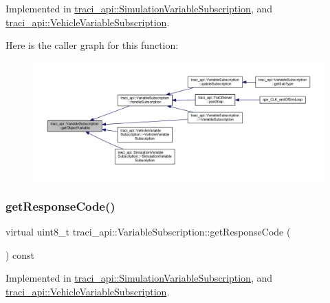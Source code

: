 Implemented in \hyperlink{classtraci__api_1_1_simulation_variable_subscription_aaa64f6368289ff45730d718e3f38f762}{traci\+\_\+api\+::\+Simulation\+Variable\+Subscription}, and \hyperlink{classtraci__api_1_1_vehicle_variable_subscription_afaefff100368a747aefb8be29e8a7a91}{traci\+\_\+api\+::\+Vehicle\+Variable\+Subscription}.

Here is the caller graph for this function\+:\nopagebreak
\begin{figure}[H]
\begin{center}
\leavevmode
\includegraphics[width=350pt]{classtraci__api_1_1_variable_subscription_a884dba03a44455e86c417c3641ec6aa4_icgraph}
\end{center}
\end{figure}
\mbox{\label{classtraci__api_1_1_variable_subscription_a3e852072c435d02f96ff91f81506cef9}} 
\subsubsection{\texorpdfstring{get\+Response\+Code()}{getResponseCode()}}
{\footnotesize\ttfamily virtual uint8\+\_\+t traci\+\_\+api\+::\+Variable\+Subscription\+::get\+Response\+Code (\begin{DoxyParamCaption}{ }\end{DoxyParamCaption}) const\hspace{0.3cm}{\ttfamily [pure virtual]}}



Implemented in \hyperlink{classtraci__api_1_1_simulation_variable_subscription_a1f5a6a5d62fe7a054f87311b0c5b6f5f}{traci\+\_\+api\+::\+Simulation\+Variable\+Subscription}, and \hyperlink{classtraci__api_1_1_vehicle_variable_subscription_a77ac472ae8dc1f284c2ec3f64b88cd0d}{traci\+\_\+api\+::\+Vehicle\+Variable\+Subscription}.

